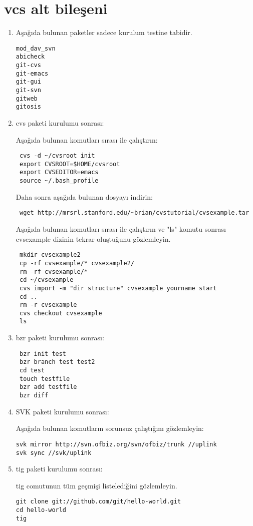 \documentclass[a4paper,10pt]{article}
\begin{document}
\section{vcs alt bileşeni}
\begin{enumerate}
\item Aşağıda bulunan paketler sadece kurulum testine tabidir.
\begin{verbatim}
mod_dav_svn
abicheck
git-cvs
git-emacs
git-gui
git-svn
gitweb
gitosis
\end{verbatim}

\item cvs paketi kurulumu sonrası:

Aşağıda bulunan komutları sırası ile çalıştırın:
\begin{verbatim}
 cvs -d ~/cvsroot init
 export CVSROOT=$HOME/cvsroot
 export CVSEDITOR=emacs
 source ~/.bash_profile
\end{verbatim}

Daha sonra aşağıda bulunan dosyayı indirin:
\begin{verbatim}
 wget http://mrsrl.stanford.edu/~brian/cvstutorial/cvsexample.tar
\end{verbatim}

Aşağıda bulunan komutları sırası ile çalıştırın ve "ls" komutu sonrası cvsexample dizinin tekrar oluştuğunu gözlemleyin.
\begin{verbatim}
 mkdir cvsexample2
 cp -rf cvsexample/* cvsexample2/
 rm -rf cvsexample/* 
 cd ~/cvsexample
 cvs import -m "dir structure" cvsexample yourname start 
 cd ..
 rm -r cvsexample 
 cvs checkout cvsexample 
 ls
\end{verbatim}

\item bzr paketi kurulumu sonrası:
\begin{verbatim}
 bzr init test
 bzr branch test test2
 cd test
 touch testfile
 bzr add testfile
 bzr diff
\end{verbatim}

\item SVK paketi kurulumu sonrası:

Aşağıda bulunan komutların sorunsuz çalıştığını gözlemleyin:
\begin{verbatim}
svk mirror http://svn.ofbiz.org/svn/ofbiz/trunk //uplink
svk sync //svk/uplink
\end{verbatim}


\item tig paketi kurulumu sonrası:

tig comutunun tüm geçmişi listelediğini gözlemleyin.
\begin{verbatim}
git clone git://github.com/git/hello-world.git 
cd hello-world
tig
\end{verbatim}



\end{enumerate}
\end{document}
